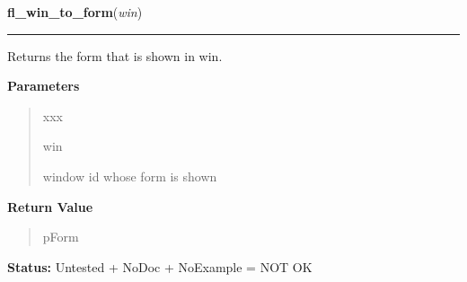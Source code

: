 \hspace{.8\funcindent}\begin{boxedminipage}{\funcwidth}

    \raggedright \textbf{fl\_win\_to\_form}(\textit{win})

    \vspace{-1.5ex}

    \rule{\textwidth}{0.5\fboxrule}
\setlength{\parskip}{2ex}
    Returns the form that is shown in win.

\setlength{\parskip}{1ex}
      \textbf{Parameters}
      \vspace{-1ex}

      \begin{quote}
        \begin{Ventry}{xxx}

          \item[win]

          window id whose form is shown

        \end{Ventry}

      \end{quote}

      \textbf{Return Value}
    \vspace{-1ex}

      \begin{quote}
      pForm

      \end{quote}

\textbf{Status:} Untested + NoDoc + NoExample = NOT OK



    \end{boxedminipage}

    \label{xformslib:library:fl_set_form_icon}

    \vspace{0.5ex}

